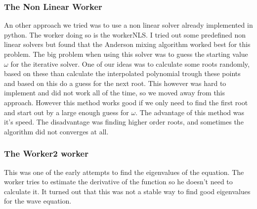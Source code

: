 \subsubsection{The Non Linear Worker}

An other approach we tried was to use a non linear solver already implemented in python.
The worker doing so is the workerNLS.
I tried out some predefined non linear solvers but found that the Anderson mixing algorithm worked best for this problem.
The big problem when using this solver was to guess the starting value  $ \omega $ for the iterative solver.
One of our ideas was to calculate some roots randomly, based on these than calculate the interpolated polynomial trough these points and based on this do a guess for the next root.
This however was hard to implement and did not work all of the time, so we moved away from this approach.
However this method works good if we only need to find the first root and start out by a large enough guess for $ \omega $.
The advantage of this method was it's speed.
The disadvantage was finding higher order roots, and sometimes the algorithm did not converges at all.


\subsubsection{The Worker2 worker}

This was one of the early attempts to find the eigenvalues of the equation.
The worker tries to estimate the derivative of the function so he doesn't need to calculate it.
It turned out that this was not a stable way to find good eigenvalues for the wave equation. 



